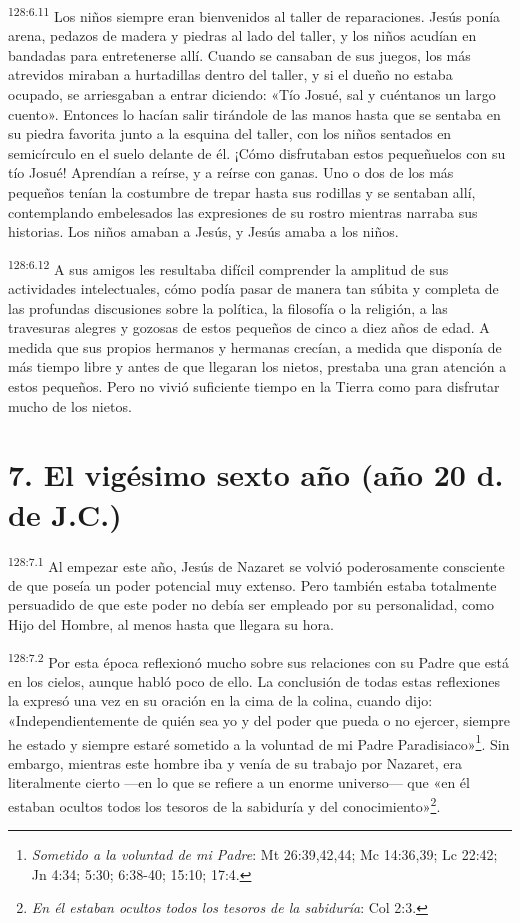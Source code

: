\par 
\textsuperscript{128:6.11} Los niños siempre eran bienvenidos al taller de reparaciones. Jesús ponía arena, pedazos de madera y piedras al lado del taller, y los niños acudían en bandadas para entretenerse allí. Cuando se cansaban de sus juegos, los más atrevidos miraban a hurtadillas dentro del taller, y si el dueño no estaba ocupado, se arriesgaban a entrar diciendo: «Tío Josué, sal y cuéntanos un largo cuento». Entonces lo hacían salir tirándole de las manos hasta que se sentaba en su piedra favorita junto a la esquina del taller, con los niños sentados en semicírculo en el suelo delante de él. ¡Cómo disfrutaban estos pequeñuelos con su tío Josué! Aprendían a reírse, y a reírse con ganas. Uno o dos de los más pequeños tenían la costumbre de trepar hasta sus rodillas y se sentaban allí, contemplando embelesados las expresiones de su rostro mientras narraba sus historias. Los niños amaban a Jesús, y Jesús amaba a los niños.

\par 
\textsuperscript{128:6.12} A sus amigos les resultaba difícil comprender la amplitud de sus actividades intelectuales, cómo podía pasar de manera tan súbita y completa de las profundas discusiones sobre la política, la filosofía o la religión, a las travesuras alegres y gozosas de estos pequeños de cinco a diez años de edad. A medida que sus propios hermanos y hermanas crecían, a medida que disponía de más tiempo libre y antes de que llegaran los nietos, prestaba una gran atención a estos pequeños. Pero no vivió suficiente tiempo en la Tierra como para disfrutar mucho de los nietos.

\section*{7. El vigésimo sexto año (año 20 d. de J.C.)}
\par 
\textsuperscript{128:7.1} Al empezar este año, Jesús de Nazaret se volvió poderosamente consciente de que poseía un poder potencial muy extenso. Pero también estaba totalmente persuadido de que este poder no debía ser empleado por su personalidad, como Hijo del Hombre, al menos hasta que llegara su hora.

\par 
\textsuperscript{128:7.2} Por esta época reflexionó mucho sobre sus relaciones con su Padre que está en los cielos, aunque habló poco de ello. La conclusión de todas estas reflexiones la expresó una vez en su oración en la cima de la colina, cuando dijo: «Independientemente de quién sea yo y del poder que pueda o no ejercer, siempre he estado y siempre estaré sometido a la voluntad de mi Padre Paradisiaco»\footnote{\textit{Sometido a la voluntad de mi Padre}: Mt 26:39,42,44; Mc 14:36,39; Lc 22:42; Jn 4:34; 5:30; 6:38-40; 15:10; 17:4.}. Sin embargo, mientras este hombre iba y venía de su trabajo por Nazaret, era literalmente cierto ---en lo que se refiere a un enorme universo--- que «en él estaban ocultos todos los tesoros de la sabiduría y del conocimiento»\footnote{\textit{En él estaban ocultos todos los tesoros de la sabiduría}: Col 2:3.}.

